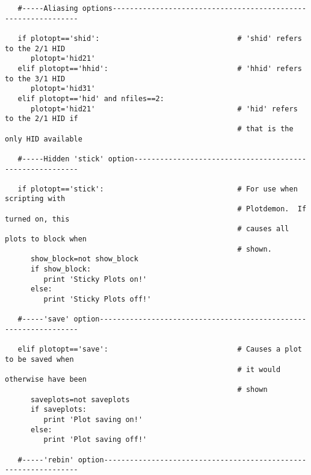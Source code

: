 \begin{verbatim}
   #-----Aliasing options--------------------------------------------------------------

   if plotopt=='shid':                                # 'shid' refers to the 2/1 HID
      plotopt='hid21'
   elif plotopt=='hhid':                              # 'hhid' refers to the 3/1 HID
      plotopt='hid31'
   elif plotopt=='hid' and nfiles==2:
      plotopt='hid21'                                 # 'hid' refers to the 2/1 HID if
                                                      # that is the only HID available

   #-----Hidden 'stick' option---------------------------------------------------------

   if plotopt=='stick':                               # For use when scripting with
                                                      # Plotdemon.  If turned on, this
                                                      # causes all plots to block when
                                                      # shown.
      show_block=not show_block
      if show_block:
         print 'Sticky Plots on!'
      else:
         print 'Sticky Plots off!'

   #-----'save' option-----------------------------------------------------------------

   elif plotopt=='save':                              # Causes a plot to be saved when
                                                      # it would otherwise have been
                                                      # shown
      saveplots=not saveplots
      if saveplots:
         print 'Plot saving on!'
      else:
         print 'Plot saving off!'

   #-----'rebin' option----------------------------------------------------------------


\end{verbatim}
